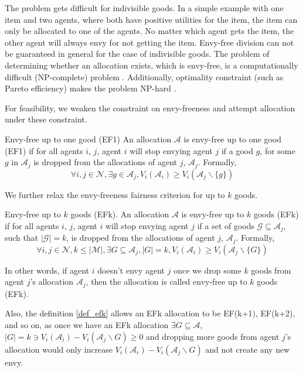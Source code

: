 The problem gets difficult for indivisible goods. In a simple example with one item and two agents, where both have positive utilities for the item, the item can only be allocated to one of the agents. No matter which agent gets the item, the other agent will always envy for not getting the item. Envy-free division can not be guaranteed in general for the case of indivisible goods. The problem of determining whether an allocation exists, which is envy-free, is a computationally difficult (NP-complete) problem \cite{lipton2004approximately}. Additionally, optimality constraint (such as Pareto efficiency) makes the problem NP-hard \cite{bouveret2008efficiency}.

For feasibility, we weaken the constraint on envy-freeness and attempt allocation under these constraint.

\begin{definition}{Envy-free up to one good (EF1) \cite{caragiannis2016unreasonable}}
\label{def_ef1}
An allocation $\mathcal{A}$ is envy-free up to one good (EF1) if for all agents $i$, $j$, agent $i$ will stop envying agent $j$ if a good $g$, for some $g$ in $\mathcal{A}_j$ is dropped from the allocations of agent $j$, $\mathcal{A}_j$. Formally,
$$
    \forall i,j \in \mathcal{N}, \exists g \in \mathcal{A}_j, V_i(\mathcal{A}_i) \geq V_i(\mathcal{A}_j \backslash \{g\})
$$
\end{definition}

We further relax the envy-freeness fairness criterion for up to $k$ goods.

\begin{definition}{Envy-free up to $k$ goods (EFk).}
\label{def_efk}
An allocation $\mathcal{A}$ is envy-free up to $k$ goods (EFk) if for all agents $i$, $j$, agent $i$ will stop envying agent $j$ if a set of goods $\mathcal{G} \subseteq \mathcal{A}_j$, such that $|\mathcal{G}| = k$, is dropped from the allocations of agent $j$, $\mathcal{A}_j$. Formally,
$$
    \forall i,j \in \mathcal{N}, k \leq |\mathcal{M}|, \exists G \subseteq \mathcal{A}_j, |G| = k, V_i(\mathcal{A}_i) \geq V_i(\mathcal{A}_j \backslash \{G\})
$$
\end{definition}

In other words, if agent $i$ doesn't envy agent $j$ once we drop some $k$ goods from agent $j$'s allocation $\mathcal{A}_j$, then the allocation is called envy-free up to $k$ goods (EFk).

Also, the definition \ref{def_efk} allows an EFk allocation to be EF(k+1), EF(k+2), and so on, as once we have an EFk allocation $ \exists G \subseteq \mathcal{A}$, $ |G|=k \ni V_i(\mathcal{A}_i) - V_i(\mathcal{A}_j \backslash G) \geq 0 $ and dropping more goods from agent $j$'s allocation would only increase $V_i(\mathcal{A}_i) - V_i(\mathcal{A}_j \backslash G)$ and not create any new envy.


